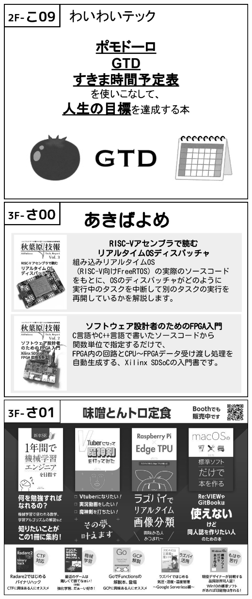 \begin{center}
\includegraphics[width=0.9\linewidth]{images/circle-appeals/2F-こ09.jpg}
\includegraphics[width=0.9\linewidth]{images/circle-appeals/3F-さ00.jpg}
\includegraphics[width=0.9\linewidth]{images/circle-appeals/3F-さ01.jpg}

\end{center}
